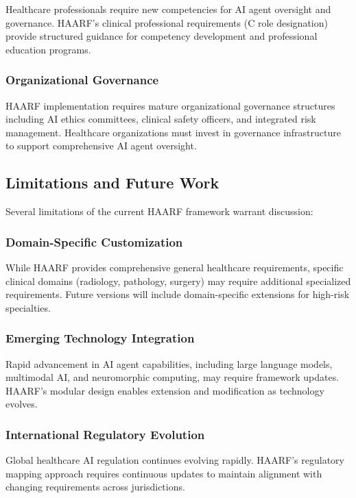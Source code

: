 \documentclass[11pt]{article}
\begin{document}
Healthcare professionals require new competencies for AI agent oversight and governance. HAARF's clinical professional requirements (C role designation) provide structured guidance for competency development and professional education programs.

\subsubsection{Organizational Governance}

HAARF implementation requires mature organizational governance structures including AI ethics committees, clinical safety officers, and integrated risk management. Healthcare organizations must invest in governance infrastructure to support comprehensive AI agent oversight.

\subsection{Limitations and Future Work}

Several limitations of the current HAARF framework warrant discussion:

\subsubsection{Domain-Specific Customization}

While HAARF provides comprehensive general healthcare requirements, specific clinical domains (radiology, pathology, surgery) may require additional specialized requirements. Future versions will include domain-specific extensions for high-risk specialties.

\subsubsection{Emerging Technology Integration}

Rapid advancement in AI agent capabilities, including large language models, multimodal AI, and neuromorphic computing, may require framework updates. HAARF's modular design enables extension and modification as technology evolves.

\subsubsection{International Regulatory Evolution}

Global healthcare AI regulation continues evolving rapidly. HAARF's regulatory mapping approach requires continuous updates to maintain alignment with changing requirements across jurisdictions.
\end{document}
